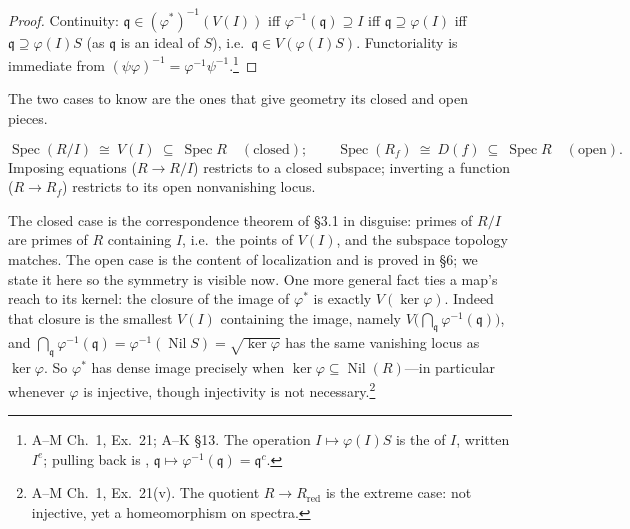 \documentclass[11pt]{article}
\DeclareMathOperator{\Spec}{Spec}
\DeclareMathOperator{\Nil}{Nil}
\newcommand{\mfq}{\mathfrak{q}}
\begin{document}
\begin{proof}
Continuity: $\mfq\in(\varphi^\ast)^{-1}(V(I))$ iff $\varphi^{-1}(\mfq)\supseteq I$ iff
$\mfq\supseteq\varphi(I)$ iff $\mfq\supseteq\varphi(I)S$ (as $\mfq$ is an ideal of $S$), i.e.\
$\mfq\in V(\varphi(I)S)$. Functoriality is immediate from
$(\psi\varphi)^{-1}=\varphi^{-1}\psi^{-1}$.\footnote{A--M Ch.~1, Ex.\ 21; A--K \S13. The
operation $I\mapsto\varphi(I)S$ is the \vocab{extension} of $I$, written $I^e$; pulling back is
\vocab{contraction}, $\mfq\mapsto\varphi^{-1}(\mfq)=\mfq^c$.}
\end{proof}

The two cases to know are the ones that give geometry its closed and open pieces.

\begin{eequation}[Quotient $=$ closed; localization $=$ open]
\[
\Spec(R/I)\ \cong\ V(I)\ \subseteq\ \Spec R \quad(\text{closed});\qquad
\Spec(R_f)\ \cong\ D(f)\ \subseteq\ \Spec R \quad(\text{open}).
\]
Imposing equations ($R\to R/I$) restricts to a closed subspace; inverting a function
($R\to R_f$) restricts to its open nonvanishing locus.
\end{eequation}

\noindent
The closed case is the correspondence theorem of \S3.1 in disguise: primes of $R/I$ are
primes of $R$ containing $I$, i.e.\ the points of $V(I)$, and the subspace topology matches.
The open case is the content of localization and is proved in \S6; we state it here so the
symmetry is visible now. One more general fact ties a map's reach to its kernel: the closure
of the image of $\varphi^\ast$ is exactly $V(\ker\varphi)$. Indeed that closure is the smallest
$V(I)$ containing the image, namely $V\big(\bigcap_{\mfq}\varphi^{-1}(\mfq)\big)$, and
$\bigcap_{\mfq}\varphi^{-1}(\mfq)=\varphi^{-1}(\Nil S)=\sqrt{\ker\varphi}$ has the same vanishing
locus as $\ker\varphi$. So $\varphi^\ast$ has dense image precisely when
$\ker\varphi\subseteq\Nil(R)$---in particular whenever $\varphi$ is injective, though injectivity
is not necessary.\footnote{A--M Ch.~1, Ex.\ 21(v). The quotient $R\to R_{\mathrm{red}}$ is the
extreme case: not injective, yet a homeomorphism on spectra.}
\end{document}

